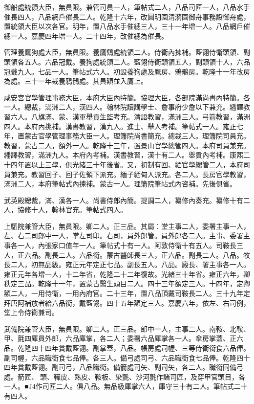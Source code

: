 \begin{pinyinscope}
御船處統領大臣，無員限。兼管司員一人，筆帖式二人，八品司匠一人，八品水手催長四人，八品網戶催長二人。乾隆十六年，改圓明園清漪園御舟事務設御舟處，置統領大臣以次各官。明年，置八品水手催總三人，三十一年增一人。八品網戶催總一人。嘉慶四年增一人。二十四年，改催總為催長。

管理養鷹狗處大臣，無員限。養鷹鷂處統領二人。侍衛內揀補。藍翎侍衛頭領、副頭領各五人。六品冠戴。養狗處統領二人。藍翎侍衛頭領五人，副頭領十人，六品冠戴九人。七品一人。筆帖式六人。初設養狗處及鷹房、鴉鶻房。乾隆十一年改房為處。三十一年裁養鴉鶻處。其員額並入鷹上。

咸安宮官學管理事務大臣，本府大臣內特簡。協理大臣，各部院滿尚書內特簡。各一人。總裁，滿洲二人，漢四人。翰林院讀講學士、詹事府少詹以下兼充。繙譯教習六人。八旗滿、蒙、漢軍舉貢生監考充。清語教習，滿洲三人。弓箭教習，滿洲四人。本府內挑補。漢書教習，漢九人。進士、舉人考補。筆帖式一人。雍正七年，置蒙古官學管理事務大臣一人。理籓院尚書簡充。總裁三人。理籓院司員充。教習，蒙古二人，額外一人。乾隆十三年，置景山官學總管四人。本府司員兼充。繙譯教習，滿洲九人。本府內考補。漢書教習，漢十有二人。舉貢內考補。康熙二十四年置以上三學，俱光緒三十年後省。又，初制有回、緬官學總管二人，本府司員兼充。教習回子、回子佐領下派充。緬子緬甸人派充。各二人。長房官學教習，滿洲二人，本府筆帖式內揀補。蒙古一人。理籓院筆帖式內咨補。先後俱省。

武英殿總裁，滿、漢各一人。尚書侍郎內簡。提調二人，纂修內奏充。纂修十有二人，協修十人，翰林官充。筆帖式四人。

上駟院兼管大臣，無員限。卿二人。正三品。其屬：堂主事二人，委署主事一人，左、右二司郎中一人，掌左司印。右司，員外郎管。員外郎各二人。主事、委署主事各一人，內張家口值年一人。筆帖式十有一人。阿敦侍衛十有五人。司鞍長三人，正六品。副長二人。六品銜。蒙古醫師長三人，正六品。副長二人。八品。牧長二人，初無品級。雍正元年定正七品。副長五人。八品。廄長、署主事各一人。雍正元年各增一人，十二年省，乾隆二十二年復故。光緒三十年省。雍正六年，卿秩定三品。乾隆十一年，置蒙古醫生頭目二人。四十三年額定三人。十四年，定卿額二人，一用侍衛，一用內府官。二十三年，置八品頂戴司鞍長二人。三十九年定拜唐阿補放者給六品銜，戴藍翎。四十五年額定三人。嘉慶六年，依左、右司例，堂上令侍衛兼司。

武備院兼管大臣，無員限。卿二人。正三品。郎中一人，主事二人。南鞍、北鞍、甲、氈四庫員外郎，六品庫掌，各二人；委署六品庫掌各一人。傘房掌蓋、正六品。乾隆四十四年賞戴藍翎。副掌蓋，八品。帳房處司幄、三等侍衛銜食六品俸。副司幄，六品職銜食七品俸。各三人。備弓處司弓、六品職銜食七品俸。乾隆四十四年賞戴藍翎。副司弓，八品職銜。備箭處司矢、副司矢，各二人。職銜同備弓處。箭匠、頭、鞾皮、熟皮、鞍板、染氈、沙河氈作諸司匠，及穿甲官頭目，各一人。■J4作司匠二人。俱八品。無品級庫掌六人，庫守三十有二人。筆帖式二十有四人。


\end{pinyinscope}
